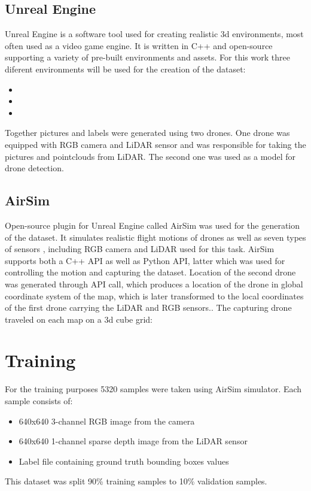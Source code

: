 \documentclass[twoside]{ctuthesis}
\theoremstyle{plain}
\theoremstyle{definition}
\theoremstyle{note}
\begin{document}
\section{Unreal Engine}
Unreal Engine is a software tool used for creating realistic 3d environments, most often used as a video game engine.
It is written in C++ and open-source supporting a variety of pre-built environments and assets. For this work three diferent environments will be used for the creation of the dataset:
\begin{itemize}
	\item {}
	\item {}
	\item {}
\end{itemize}
Together  pictures and labels were generated using two drones. One drone was equipped with RGB camera and LiDAR sensor and was responsible for taking the pictures and pointclouds from LiDAR. The second one was used as a model for drone detection.
\section{AirSim}
Open-source plugin for Unreal Engine called AirSim was used for the generation of the dataset. It simulates realistic flight motions of drones as well as seven types of sensors , including RGB camera and LiDAR used for this task. AirSim supports both a C++ API as well as Python API, latter which was used for controlling the motion and capturing the dataset. Location of the second drone was generated through API call, which produces a location of the drone in global coordinate system of the map, which is later transformed to the local coordinates of the first drone carrying the LiDAR and RGB sensors.. The capturing drone traveled on each map on a 3d cube grid:
\chapter{Training}
For the training purposes 5320 samples were taken using AirSim simulator. Each sample consists of:
\begin{itemize}
	\item 640x640 3-channel RGB image from the camera
	\item 640x640 1-channel sparse depth image from the LiDAR sensor
	\item Label file containing ground truth bounding boxes values
\end{itemize}
This dataset was split 90\% training samples to 10\% validation samples. 
\end{document}
